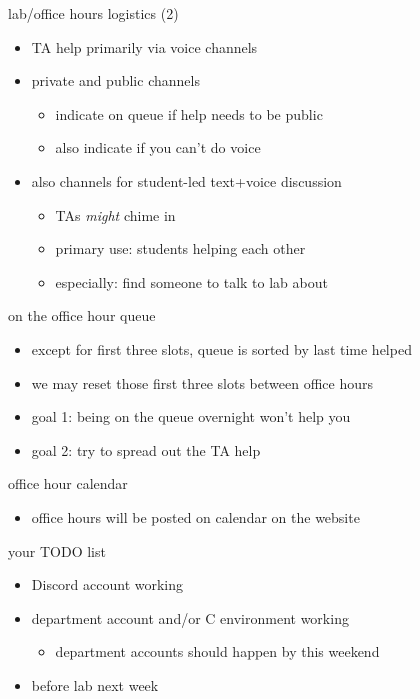 \begin{frame}{lab/office hours logistics (2)}
    \begin{itemize}
    \item TA help primarily via voice channels
    \item private and public channels
        \begin{itemize}
        \item indicate on queue if help needs to be public
        \item also indicate if you can't do voice
        \end{itemize}
    \vspace{.5cm}
    \item also channels for student-led text+voice discussion
        \begin{itemize}
        \item TAs \textit{might} chime in
        \item primary use: students helping each other
        \item especially: find someone to talk to lab about
        \end{itemize}
    \end{itemize}
\end{frame}


\begin{frame}{on the office hour queue}
    \begin{itemize}
    \item except for first three slots, queue is sorted by last time helped
    \item we may reset those first three slots between office hours
    \vspace{.5cm}
    \item goal 1: being on the queue overnight won't help you
    \item goal 2: try to spread out the TA help
    \end{itemize}
\end{frame}


\begin{frame}{office hour calendar}
    \begin{itemize}
    \item office hours will be posted on calendar on the website
    \end{itemize}
\end{frame}

\begin{frame}{your TODO list}
    \begin{itemize}
    \item Discord account working
    \item department account and/or C environment working
        \begin{itemize}
        \item department accounts should happen by this weekend
        \end{itemize}
    \item before lab next week
    \end{itemize}
\end{frame}

